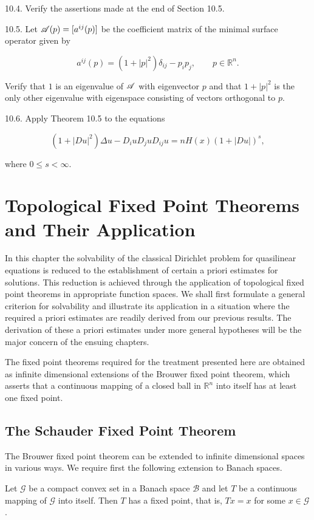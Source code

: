 10.4. Verify the assertions made at the end of Section 10.5.

10.5. Let $\mathscr{A}(p)=[a^{ij}(p)]$ be the coefficient matrix of the minimal surface operator
given by

\[
a^{ij}(p)=(1+|p|^{2})\delta_{ij}-p_{i}p_{j},\qquad p\in \mathbb{R}^{n}.
\]

Verify that $1$ is an eigenvalue of $\mathscr{A}$ with eigenvector $p$ and that $1+|p|^{2}$ is the only
other eigenvalue with eigenspace consisting of vectors orthogonal to $p$.

10.6. Apply Theorem 10.5 to the equations

\[
(1+|Du|^{2})\Delta u-D_{i}uD_{j}uD_{ij}u=nH(x)(1+|Du|)^{s},
\]

where $0\le s<\infty$.



\chapter{Topological Fixed Point Theorems and Their Application}

In this chapter the solvability of the classical Dirichlet problem for quasilinear equations is reduced to the establishment of certain a priori estimates for solutions. This reduction is achieved through the application of topological fixed point theorems in appropriate function spaces. We shall first formulate a general criterion for solvability and illustrate its application in a situation where the required a priori estimates are readily derived from our previous results. The derivation of these a priori estimates under more general hypotheses will be the major concern of the ensuing chapters.

The fixed point theorems required for the treatment presented here are obtained as infinite dimensional extensions of the Brouwer fixed point theorem, which asserts that a continuous mapping of a closed ball in $\mathbb{R}^n$ into itself has at least one fixed point.

\section{The Schauder Fixed Point Theorem}

The Brouwer fixed point theorem can be extended to infinite dimensional spaces in various ways. We require first the following extension to Banach spaces.

\begin{theorem}[11.1]
Let $\mathcal{G}$ be a compact convex set in a Banach space $\mathcal{B}$ and let $T$ be a continuous mapping of $\mathcal{G}$ into itself. Then $T$ has a fixed point, that is, $Tx = x$ for some $x \in \mathcal{G}$.
\end{theorem}

